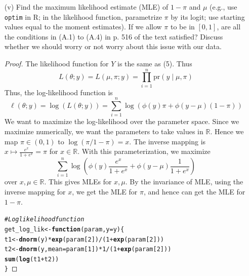 \documentclass[letterpaper, 12pt]{article}\usepackage[]{graphicx}\usepackage[]{color}
\makeatletter
\newcommand{\hlnum}[1]{\textcolor[rgb]{0.686,0.059,0.569}{#1}}%
\newcommand{\hlcom}[1]{\textcolor[rgb]{0.678,0.584,0.686}{\textit{#1}}}%
\newcommand{\hlopt}[1]{\textcolor[rgb]{0,0,0}{#1}}%
\newcommand{\hlstd}[1]{\textcolor[rgb]{0.345,0.345,0.345}{#1}}%
\newcommand{\hlkwa}[1]{\textcolor[rgb]{0.161,0.373,0.58}{\textbf{#1}}}%
\newcommand{\hlkwb}[1]{\textcolor[rgb]{0.69,0.353,0.396}{#1}}%
\newcommand{\hlkwc}[1]{\textcolor[rgb]{0.333,0.667,0.333}{#1}}%
\newcommand{\hlkwd}[1]{\textcolor[rgb]{0.737,0.353,0.396}{\textbf{#1}}}%
\newenvironment{kframe}{%
 \def\at@end@of@kframe{}%
 \ifinner\ifhmode%
  \def\at@end@of@kframe{\end{minipage}}%
  \begin{minipage}{\columnwidth}%
 \fi\fi%
 \def\FrameCommand##1{\hskip\@totalleftmargin \hskip-\fboxsep
 \colorbox{shadecolor}{##1}\hskip-\fboxsep
     \hskip-\linewidth \hskip-\@totalleftmargin \hskip\columnwidth}%
 \MakeFramed {\advance\hsize-\width
   \@totalleftmargin\z@ \linewidth\hsize
   \@setminipage}}%
 {\par\unskip\endMakeFramed%
 \at@end@of@kframe}
\newenvironment{knitrout}{}{} %
\newcommand{\pr}{\text{pr}}
\newcommand{\R}{\mathbb{R}}
\makeatother
\begin{document}
\begin{enumerate}
\begin{enumerate}
\begin{proof}
\end{proof}

\item[(v)]
Find the maximum likelihood estimate (MLE) of $1 - \pi$ and $\mu$ (e.g., use \texttt{optim} in R; in the likelihood function, parametrize $\pi$ by its logit; use starting values equal to the moment estimates). If we allow $\pi$ to be in $[0,1]$, are all the conditions in (A.1) to (A.4) in p. 516 of the text satisfied? Discuss whether we should worry or not worry about this issue with our data.
\begin{proof}
The likelihood function for $Y$ is the same as (5). Thus
\begin{equation*}
L(\theta; y) = L(\mu, \pi; y) = \prod_{i=1}^n \pr(y \mid \mu, \pi)
\end{equation*}
Thus, the log-likelihood function is
\begin{equation*}
\label{lleq}
\ell (\theta; y) = \log (L(\theta;y)) 
= \sum_{i=1}^n  \log(\phi(y)\pi
+
\phi(y-\mu)(1-\pi))
\end{equation*}
We want to maximize the log-likelihood over the parameter space.
Since we maximize numerically, we want the parameters to take values in $\R$. 
Hence we map $\pi \in (0,1)$ to $\log(\pi / 1-\pi) = x$. 
The inverse mapping is $x \mapsto \frac{e^x}{1+e^x} = \pi$ for $x \in \R$.
With this parameterization, we maximize
\begin{equation}
\sum_{i=1}^n
\log \left(
\phi(y)
\frac{e^x}{1+e^x}
+ 
\phi(y -\mu) 
\frac{1}{1+e^x}
\right) 
\end{equation}
over $x,\mu \in \R$. This gives MLEs for $x, \mu$. 
By the invariance of MLE, using the inverse mapping for $x$, we get the MLE for $\pi$, and hence can get the MLE for $1-\pi$.
\begin{knitrout}
\color{fgcolor}\begin{kframe}
\begin{alltt}
\hlcom{# Log likelihood function}
\hlstd{get_log_lik} \hlkwb{<-} \hlkwa{function}\hlstd{(}\hlkwc{param}\hlstd{,} \hlkwc{y} \hlstd{= y) \{}
    \hlstd{t1} \hlkwb{<-} \hlkwd{dnorm}\hlstd{(y)} \hlopt{*} \hlkwd{exp}\hlstd{(param[}\hlnum{2}\hlstd{])}\hlopt{/}\hlstd{(}\hlnum{1} \hlopt{+} \hlkwd{exp}\hlstd{(param[}\hlnum{2}\hlstd{]))}
    \hlstd{t2} \hlkwb{<-} \hlkwd{dnorm}\hlstd{(y,} \hlkwc{mean} \hlstd{= param[}\hlnum{1}\hlstd{])} \hlopt{*} \hlnum{1}\hlopt{/}\hlstd{(}\hlnum{1} \hlopt{+} \hlkwd{exp}\hlstd{(param[}\hlnum{2}\hlstd{]))}
    \hlkwd{sum}\hlstd{(}\hlkwd{log}\hlstd{(t1} \hlopt{+} \hlstd{t2))}
\hlstd{\}}


\end{alltt}
\end{kframe}
\end{knitrout}
\end{proof}
\end{enumerate}
\end{enumerate}
\end{document}
